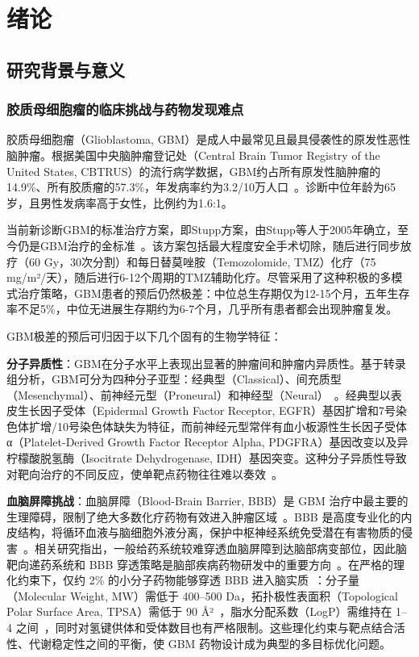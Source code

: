 \chapter{绪论}\label{chap:introduction}

\section{研究背景与意义}\label{sec:background}

\subsection{胶质母细胞瘤的临床挑战与药物发现难点}\label{sec:gbm-clinical}

胶质母细胞瘤（Glioblastoma, GBM）是成人中最常见且最具侵袭性的原发性恶性脑肿瘤。根据美国中央脑肿瘤登记处（Central Brain Tumor Registry of the United States, CBTRUS）的流行病学数据，GBM约占所有原发性脑肿瘤的14.9\%、所有胶质瘤的57.3\%，年发病率约为3.2/10万人口~\cite{Stupp2005}。诊断中位年龄为65岁，且男性发病率高于女性，比例约为1.6:1。

当前新诊断GBM的标准治疗方案，即Stupp方案，由Stupp等人于2005年确立，至今仍是GBM治疗的金标准~\cite{Stupp2005}。该方案包括最大程度安全手术切除，随后进行同步放疗（60 Gy，30次分割）和每日替莫唑胺（Temozolomide, TMZ）化疗（75 mg/m²/天），随后进行6-12个周期的TMZ辅助化疗。尽管采用了这种积极的多模式治疗策略，GBM患者的预后仍然极差：中位总生存期仅为12-15个月，五年生存率不足5\%，中位无进展生存期约为6-7个月，几乎所有患者都会出现肿瘤复发。

GBM极差的预后可归因于以下几个固有的生物学特征：

\textbf{分子异质性}：GBM在分子水平上表现出显著的肿瘤间和肿瘤内异质性。基于转录组分析，GBM可分为四种分子亚型：经典型（Classical）、间充质型（Mesenchymal）、前神经元型（Proneural）和神经型（Neural）~\cite{Verhaak2010}。经典型以表皮生长因子受体（Epidermal Growth Factor Receptor, EGFR）基因扩增和7号染色体扩增/10号染色体缺失为特征，而前神经元型常伴有血小板源性生长因子受体 α（Platelet-Derived Growth Factor Receptor Alpha, PDGFRA）基因改变以及异柠檬酸脱氢酶（Isocitrate Dehydrogenase, IDH）基因突变。这种分子异质性导致对靶向治疗的不同反应，使单靶点药物往往难以奏效~\cite{Verhaak2010}。

\textbf{血脑屏障挑战}：血脑屏障（Blood-Brain Barrier, BBB）是 GBM 治疗中最主要的生理障碍，限制了绝大多数化疗药物有效进入肿瘤区域~\cite{Pardridge2012}。BBB 是高度专业化的内皮结构，将循环血液与脑细胞外液分离，保护中枢神经系统免受潜在有害物质的侵害~\cite{Ferraris2020}。相关研究指出，一般给药系统较难穿透血脑屏障到达脑部病变部位，因此脑靶向递药系统和 BBB 穿透策略是脑部疾病药物研发中的重要方向~\cite{翁丹芳2021}。在严格的理化约束下，仅约 2\% 的小分子药物能够穿透 BBB 进入脑实质~\cite{Pardridge2012}：分子量（Molecular Weight, MW）需低于 400--500 Da，拓扑极性表面积（Topological Polar Surface Area, TPSA）需低于 90 Å²~\cite{Ertl2000}，脂水分配系数（LogP）需维持在 1--4 之间~\cite{Ferraris2020}，同时对氢键供体和受体数目也有严格限制。这些理化约束与靶点结合活性、代谢稳定性之间的平衡，使 GBM 药物设计成为典型的多目标优化问题。

